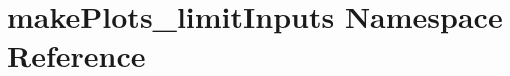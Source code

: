 \hypertarget{namespacemakePlots__limitInputs}{
\section{makePlots\_\-limitInputs Namespace Reference}
\label{namespacemakePlots__limitInputs}
}
